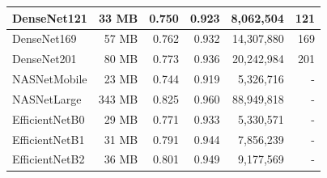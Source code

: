 \begin{table}[h!]
\begin{tabular}{|l|r|r|r|r|r|}
    DenseNet121       & 33 MB                              & 0.750                                                                                   & 0.923                                                                                   & 8,062,504                                & 121                                 \\ \hline
    DenseNet169       & 57 MB                              & 0.762                                                                                   & 0.932                                                                                   & 14,307,880                               & 169                                 \\ \hline
    DenseNet201       & 80 MB                              & 0.773                                                                                   & 0.936                                                                                   & 20,242,984                               & 201                                 \\ \hline
    NASNetMobile      & 23 MB                              & 0.744                                                                                   & 0.919                                                                                   & 5,326,716                                & -                                   \\ \hline
    NASNetLarge       & 343 MB                             & 0.825                                                                                   & 0.960                                                                                   & 88,949,818                               & -                                   \\ \hline
    EfficientNetB0    & 29 MB                              & 0.771                                                                                   & 0.933                                                                                   & 5,330,571                                & -                                   \\ \hline
    EfficientNetB1    & 31 MB                              & 0.791                                                                                   & 0.944                                                                                   & 7,856,239                                & -                                   \\ \hline
    EfficientNetB2    & 36 MB                              & 0.801                                                                                   & 0.949                                                                                   & 9,177,569                                & -                                   \\ \hline

\end{tabular}
\end{table}
